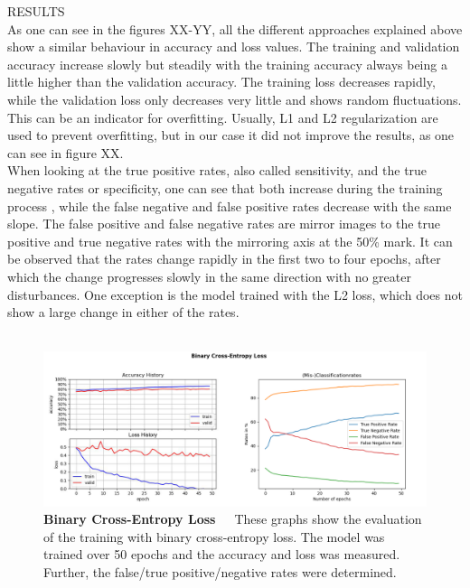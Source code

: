RESULTS \\
As one can see in the figures XX-YY, all the different approaches explained above show a similar behaviour in accuracy and loss values. The training and validation accuracy increase slowly but steadily with the training accuracy always being a little higher than the validation accuracy. The training loss decreases rapidly, while the validation loss only decreases very little and shows random fluctuations. This can be an indicator for overfitting. Usually, L1 and L2 regularization are used to prevent overfitting, but in our case it did not improve the results, as one can see in figure XX. \\
When looking at the true positive rates, also called sensitivity, and the true negative rates or specificity, one can see that both increase during the training process , while the false negative and false positive rates decrease with the same slope. The false positive and false negative rates are mirror images to the true positive and true negative rates with the mirroring axis at the 50\% mark. It can be observed that the rates change rapidly in the first two to four epochs, after which the change progresses slowly in the same direction with no greater disturbances. One exception is the model trained with the L2 loss, which does not show a large change in either of the rates. \\
\\
\begin{figure}[h]
	\centering
	\includegraphics[scale=0.37]{Figures/chapter04/multilabel_crossentropy.png}
	\decoRule
	\caption[Binary Cross-Entropy Loss]{\textbf{Binary Cross-Entropy Loss}~~~These graphs show the evaluation of the training with binary cross-entropy loss. The model was trained over 50 epochs and the accuracy and loss was measured. Further, the false/true positive/negative rates were determined.}
	\label{fig:MultilabelCrossentropy}
\end{figure}
\\
